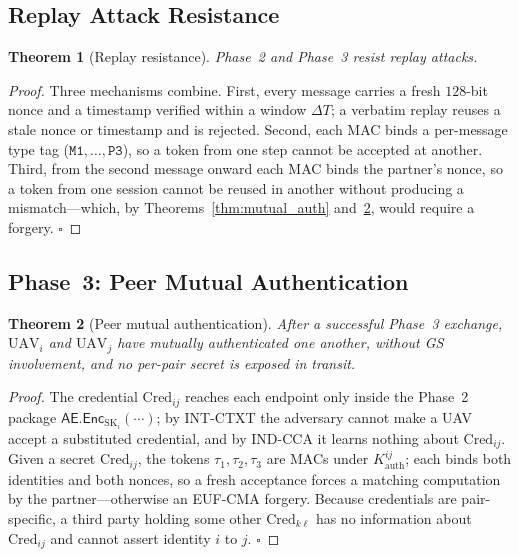 \documentclass[11pt,a4paper]{article}
\newtheorem{theorem}{Theorem}
\begin{document}
\subsection{Replay Attack Resistance}

\begin{theorem}[Replay resistance]
\label{thm:replay}
Phase~2 and Phase~3 resist replay attacks.
\end{theorem}

\begin{proof}
Three mechanisms combine. First, every message carries a fresh $128$-bit nonce
and a timestamp verified within a window $\Delta T$; a verbatim replay reuses a
stale nonce or timestamp and is rejected. Second, each MAC binds a per-message
type tag ($\texttt{M1},\dots,\texttt{P3}$), so a token from one step cannot be
accepted at another. Third, from the second message onward each MAC binds the
partner's nonce, so a token from one session cannot be reused in another without
producing a mismatch---which, by Theorems~\ref{thm:mutual_auth}
and~\ref{thm:peer_auth}, would require a forgery. \hfill$\square$
\end{proof}

\subsection{Phase~3: Peer Mutual Authentication}

\begin{theorem}[Peer mutual authentication]
\label{thm:peer_auth}
After a successful Phase~3 exchange, $\text{UAV}_i$ and $\text{UAV}_j$ have
mutually authenticated one another, without GS involvement, and no per-pair
secret is exposed in transit.
\end{theorem}

\begin{proof}
The credential $\text{Cred}_{ij}$ reaches each endpoint only inside the Phase~2
package $\mathsf{AE}.\mathsf{Enc}_{\text{SK}_i}(\cdots)$; by INT-CTXT the
adversary cannot make a UAV accept a substituted credential, and by IND-CCA it
learns nothing about $\text{Cred}_{ij}$. Given a secret $\text{Cred}_{ij}$, the
tokens $\tau_1,\tau_2,\tau_3$ are MACs under
$K^{ij}_{\text{auth}}$; each binds both identities and both nonces, so a fresh
acceptance forces a matching computation by the partner---otherwise an EUF-CMA
forgery. Because credentials are pair-specific, a third party holding some other
$\text{Cred}_{k\ell}$ has no information about $\text{Cred}_{ij}$ and cannot
assert identity $i$ to $j$. \hfill$\square$
\end{proof}
\end{document}
